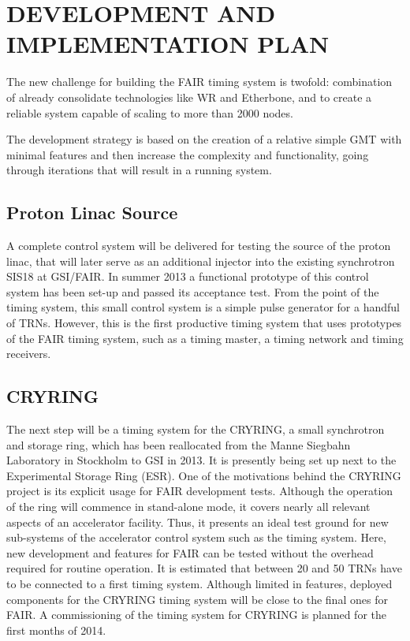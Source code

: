 \section{DEVELOPMENT AND IMPLEMENTATION PLAN}

The new challenge for building the FAIR timing system is
twofold: combination of already consolidate technologies like WR and 
Etherbone, and to create a reliable system capable of scaling
to more than 2000 nodes. 

The development strategy is based on the creation of a relative simple GMT 
with minimal features and then increase the complexity and functionality, going
through iterations that will result in a running system.

\subsection{Proton Linac Source}

A complete control system will  be delivered for testing the source of
the proton linac, that will later serve as an additional injector into
the  existing  synchrotron  SIS18  at  GSI/FAIR.   In  summer  2013  a
functional prototype of this control system has been set-up and passed
its acceptance test.  From the  point of the timing system, this small
control  system is a  simple pulse  generator for  a handful  of TRNs.
However,  this  is  the  first  productive  timing  system  that  uses
prototypes  of the  FAIR timing  system, such  as a  timing  master, a
timing network and timing receivers.

\subsection{CRYRING}

 The next  step will be a  timing system
 for the CRYRING, a small  synchrotron and storage ring, which has been
 reallocated   from  the   Manne  Siegbahn   Laboratory   in  Stockholm
 \cite{cryring} to GSI  in 2013. It is presently  being set up next
 to the Experimental Storage Ring (ESR).  One of the motivations behind
 the CRYRING project is its  explicit usage for FAIR development tests.
 Although the operation of the  ring will commence in stand-alone mode,
 it  covers nearly  all relevant  aspects of  an  accelerator facility.
 Thus,  it presents an  ideal test  ground for  new sub-systems  of the
 accelerator  control system  such  as the  timing  system.  Here,  new
 development and features  for FAIR can be tested  without the overhead
 required for routine  operation.  It is estimated that  between 20 and
 50  TRNs have  to be  connected to  a first  timing  system.  Although
 limited in features, deployed components for the CRYRING timing system
 will  be close  to the  final ones  for FAIR.  A commissioning  of the
 timing system for CRYRING is planned for the first months of 2014.


